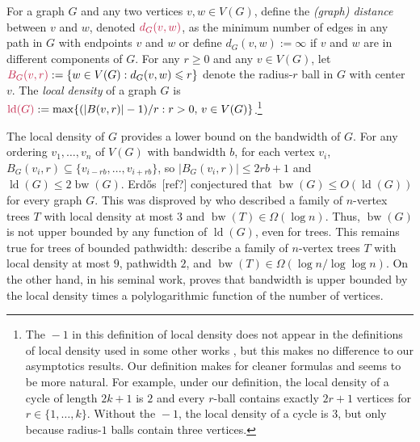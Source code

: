 \documentclass{patmorin}
\makeatletter
\renewcommand{\ge}{\geqslant}
\renewcommand{\le}{\leqslant}
\renewcommand{\leq}{\leqslant}
\newcommand{\defin}[1]{\emph{\textcolor{brightmaroon}{#1}}}
\def\mathcolor#1#{\@mathcolor{#1}}
\def\@mathcolor#1#2#3{%
  \protect\leavevmode
  \begingroup
    \color#1{#2}#3%
  \endgroup
}
\newcommand{\mathdefin}[1]{\mathcolor{brightmaroon}{#1}}
\DeclareMathOperator{\bw}{bw}
\DeclareMathOperator{\ld}{ld}
\makeatother
\begin{document}
For a graph $G$ and any two vertices $v,w\in V(G)$, define the \defin{(graph) distance} between $v$ and $w$, denoted $\mathdefin{d_G(v,w)}$, as the minimum number of edges in any path in $G$ with endpoints $v$ and $w$ or define $d_G(v,w):=\infty$ if $v$ and $w$ are in different components of $G$.  For any $r\ge 0$ and any $v\in V(G)$, let $\mathdefin{B_G(v,r)}:=\{w\in V(G):d_G(v,w)\le r\}$ denote the radius-$r$ ball in $G$ with center $v$.
The \defin{local density} of a graph $G$ is $\mathdefin{\ld(G)}:=\max\{(|B(v,r)|-1)/r:r> 0,\, v\in V(G)\}$.\footnote{The ${}-1$ in this definition of local density does not appear in the definitions of local density used in some other works \cite{feige:approximating,rao:small}, but this makes no difference to our asymptotics results.  Our definition makes for cleaner formulas and seems to be more natural. For example, under our definition, the local density of a cycle of length $2k+1$ is $2$ and every $r$-ball contains exactly $2r+1$ vertices for $r\in\{1,\ldots,k\}$. Without the ${}-1$, the local density of a cycle is $3$, but only because radius-$1$ balls contain three vertices.}



The local density of $G$ provides a lower bound on the bandwidth of $G$. For any ordering $v_1,\dots,v_n$ of $V(G)$ with bandwidth $b$, for each vertex $v_i$, $B_G(v_i,r) \subseteq \{v_{i-rb},\dots,v_{i+rb}\}$, so $|B_G(v_i,r)|\leq 2rb+1$ and $\ld(G)\leq 2\bw(G)$. Erd\H{o}s~[ref?] conjectured that $\bw(G)\leq O(\ld(G))$ for every graph $G$. This was disproved by \citet{chvatalova:on} who described a family of $n$-vertex trees $T$ with local density at most $3$ and $\bw(T)\in\Omega(\log n)$. Thus, $\bw(G)$ is not upper bounded by any function of $\ld(G)$, even for trees. This remains true for trees of bounded pathwidth: \citet{CS89} describe a family of $n$-vertex trees $T$ with local density at most $9$, pathwidth $2$, and  $\bw(T)\in\Omega(\log n/\log\log n)$. On the other hand, in his seminal work, \citet{feige:approximating} proves that bandwidth is upper bounded by the local density times a polylogarithmic function of the number of vertices.
\end{document}
